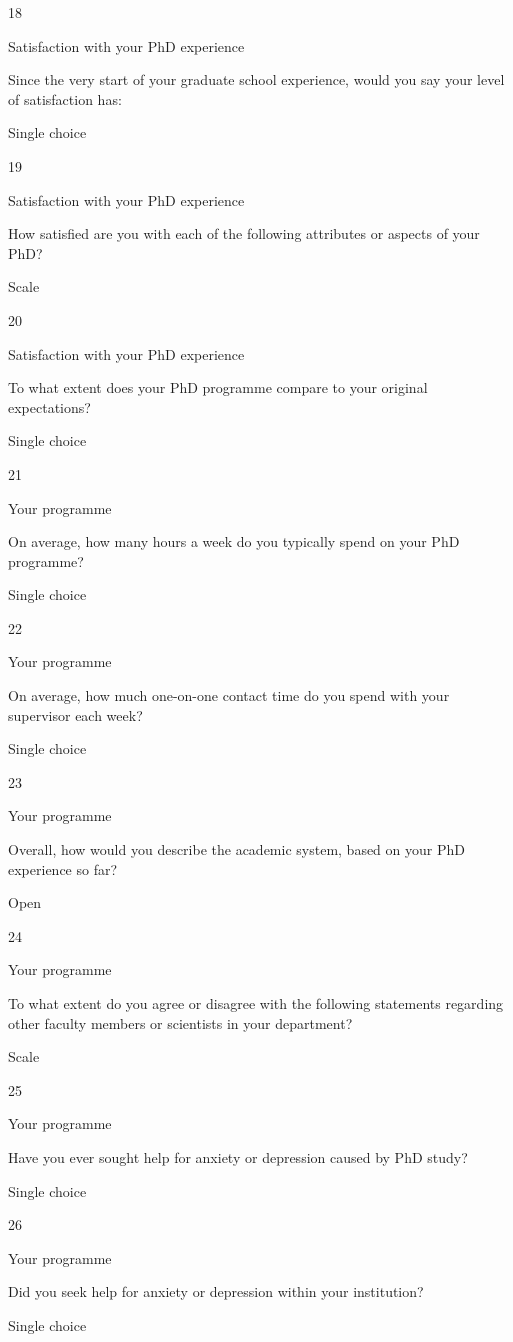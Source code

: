 \documentclass[
]{article}
\begin{document}
18

Satisfaction with your PhD experience

Since the very start of your graduate school experience, would you say
your level of satisfaction has:

Single choice

19

Satisfaction with your PhD experience

How satisfied are you with each of the following attributes or aspects
of your PhD?

Scale

20

Satisfaction with your PhD experience

To what extent does your PhD programme compare to your original
expectations?

Single choice

21

Your programme

On average, how many hours a week do you typically spend on your PhD
programme?

Single choice

22

Your programme

On average, how much one-on-one contact time do you spend with your
supervisor each week?

Single choice

23

Your programme

Overall, how would you describe the academic system, based on your PhD
experience so far?

Open

24

Your programme

To what extent do you agree or disagree with the following statements
regarding other faculty members or scientists in your department?

Scale

25

Your programme

Have you ever sought help for anxiety or depression caused by PhD study?

Single choice

26

Your programme

Did you seek help for anxiety or depression within your institution?

Single choice
\end{document}
